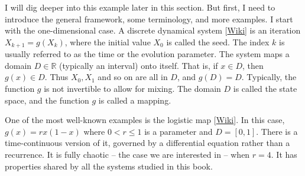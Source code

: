 \documentclass[oneside,10pt]{book}
\begin{document}
I will dig deeper into this example later in this section. But first, I need to introduce the general framework, some terminology, and more examples. I start with the one-dimensional case.  A
 \textcolor{index}{discrete dynamical system} [\href{https://en.wikipedia.org/wiki/Dynamical_system}{Wiki}] is an iteration $X_{k+1} = g(X_k)$, where the initial value
 $X_0$ is called the \textcolor{index}{seed}. The index $k$ is usually referred to as the time or the
\textcolor{index}{evolution parameter}. The system maps a domain $D\in \mathbb{R}$ (typically an interval) onto itself. That is, if $x\in D$, then $g(x)\in D$. Thus $X_0, X_1$ and so on are all in $D$, and $g(D) = D$. Typically, the function $g$ is
 not invertible to allow for mixing. The domain $D$ is called the \textcolor{index}{state space}, and
the function $g$ is called a \textcolor{index}{mapping}.

One of the most well-known examples is the
\textcolor{index}{logistic map} [\href{https://en.wikipedia.org/wiki/Logistic_map}{Wiki}]. In this case, $g(x) = r x(1-x)$ where $0<r \leq 1$ is a parameter and $D=[0, 1]$. There is a time-continuous version of it, governed by a differential equation rather than a recurrence. It is fully chaotic -- the case we are interested in -- when $r=4$. It has properties shared by all the systems studied in this book.
\end{document}
